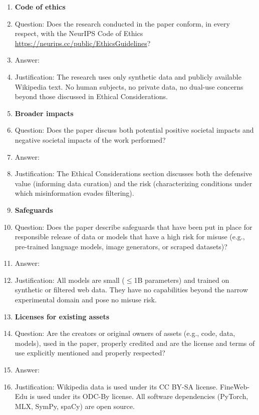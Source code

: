 \documentclass{article}
\begin{document}
\begin{enumerate}
\item {\bf Code of ethics}
    \item[] Question: Does the research conducted in the paper conform, in every respect, with the NeurIPS Code of Ethics \url{https://neurips.cc/public/EthicsGuidelines}?
    \item[] Answer: \answerYes{}
    \item[] Justification: The research uses only synthetic data and publicly available Wikipedia text. No human subjects, no private data, no dual-use concerns beyond those discussed in Ethical Considerations.

\item {\bf Broader impacts}
    \item[] Question: Does the paper discuss both potential positive societal impacts and negative societal impacts of the work performed?
    \item[] Answer: \answerYes{}
    \item[] Justification: The Ethical Considerations section discusses both the defensive value (informing data curation) and the risk (characterizing conditions under which misinformation evades filtering).

\item {\bf Safeguards}
    \item[] Question: Does the paper describe safeguards that have been put in place for responsible release of data or models that have a high risk for misuse (e.g., pre-trained language models, image generators, or scraped datasets)?
    \item[] Answer: \answerNA{}
    \item[] Justification: All models are small ($\leq$1B parameters) and trained on synthetic or filtered web data. They have no capabilities beyond the narrow experimental domain and pose no misuse risk.

\item {\bf Licenses for existing assets}
    \item[] Question: Are the creators or original owners of assets (e.g., code, data, models), used in the paper, properly credited and are the license and terms of use explicitly mentioned and properly respected?
    \item[] Answer: \answerYes{}
    \item[] Justification: Wikipedia data is used under its CC BY-SA license. FineWeb-Edu \citep{penedo2024fineweb} is used under its ODC-By license. All software dependencies (PyTorch, MLX, SymPy, spaCy) are open source.


\end{enumerate}
\end{document}
